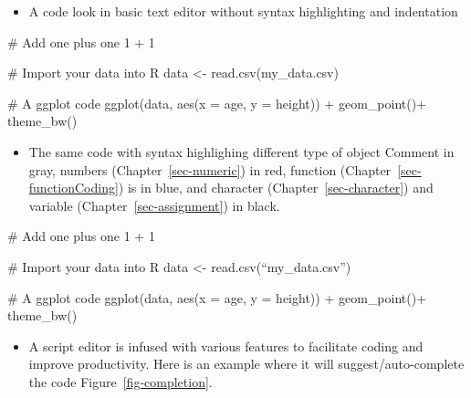 \documentclass[
  letterpaper,
  DIV=11,
  numbers=noendperiod]{scrreprt}
\newenvironment{Shaded}{\begin{snugshade}}{\end{snugshade}}
\newcommand{\AttributeTok}[1]{\textcolor[rgb]{0.40,0.45,0.13}{#1}}
\newcommand{\CommentTok}[1]{\textcolor[rgb]{0.37,0.37,0.37}{#1}}
\newcommand{\DecValTok}[1]{\textcolor[rgb]{0.68,0.00,0.00}{#1}}
\newcommand{\FunctionTok}[1]{\textcolor[rgb]{0.28,0.35,0.67}{#1}}
\newcommand{\NormalTok}[1]{\textcolor[rgb]{0.00,0.23,0.31}{#1}}
\newcommand{\OtherTok}[1]{\textcolor[rgb]{0.00,0.23,0.31}{#1}}
\newcommand{\SpecialCharTok}[1]{\textcolor[rgb]{0.37,0.37,0.37}{#1}}
\providecommand{\tightlist}{%
  \setlength{\itemsep}{0pt}\setlength{\parskip}{0pt}}
\begin{document}

\begin{itemize}
\tightlist
\item
  A code look in basic text editor without syntax highlighting and
  indentation
\end{itemize}

\begin{Shaded}
\begin{Highlighting}[]
\NormalTok{\# Add one plus one}
\NormalTok{1 + 1}

\NormalTok{\# Import your data into R}
\NormalTok{data \textless{}{-} read.csv(\textquotesingle{}my\_data.csv\textquotesingle{})}

\NormalTok{\# A ggplot code}
\NormalTok{ggplot(data, aes(x = age, y = height)) +}
\NormalTok{geom\_point()+}
\NormalTok{theme\_bw()}
\end{Highlighting}
\end{Shaded}

\begin{itemize}
\tightlist
\item
  The same code with syntax highlighing different type of object Comment
  in gray, numbers (Chapter~\ref{sec-numeric}) in red, function
  (Chapter~\ref{sec-functionCoding}) is in blue, and character
  (Chapter~\ref{sec-character}) and variable
  (Chapter~\ref{sec-assignment}) in black.
\end{itemize}

\begin{Shaded}
\begin{Highlighting}[]
\CommentTok{\# Add one plus one}
\DecValTok{1} \SpecialCharTok{+} \DecValTok{1}

\CommentTok{\# Import your data into R}
\NormalTok{data }\OtherTok{\textless{}{-}} \FunctionTok{read.csv}\NormalTok{(“my\_data.csv”)}


\CommentTok{\# A ggplot code}
\FunctionTok{ggplot}\NormalTok{(data, }\FunctionTok{aes}\NormalTok{(}\AttributeTok{x =}\NormalTok{ age, }\AttributeTok{y =}\NormalTok{ height)) }\SpecialCharTok{+}
    \FunctionTok{geom\_point}\NormalTok{()}\SpecialCharTok{+}
    \FunctionTok{theme\_bw}\NormalTok{()}
\end{Highlighting}
\end{Shaded}

\begin{itemize}
\tightlist
\item
  A script editor is infused with various features to facilitate coding
  and improve productivity. Here is an example where it will
  suggest/auto-complete the code Figure~\ref{fig-completion}.
\end{itemize}
\end{document}
